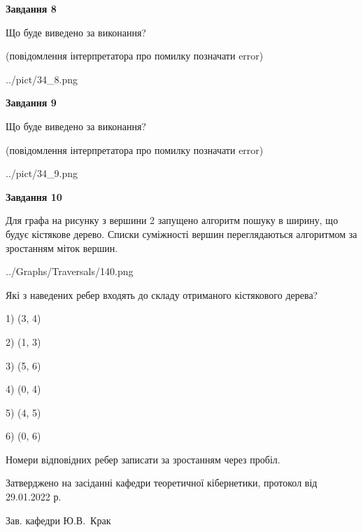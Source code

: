 \documentclass[12pt, ukrainian]{article}
\begin{document}
{\begin {large}
{\begin {center}\textbf{Завдання 8}\end {center}}\par
Що буде виведено за виконання?\par
 (повідомлення інтерпретатора про помилку позначати error)\par
\begin{center}
	{../pict/34_8.png}
\end{center}
\newpage

{\begin {center}\textbf{Завдання 9}\end {center}}\par
Що буде виведено за виконання?\par
 (повідомлення інтерпретатора про помилку позначати error)\par
\begin{center}
	{../pict/34_9.png}
\end{center}
\newpage

{\begin {center}\textbf{Завдання 10}\end {center}}\par
Для графа на рисунку з вершини 2 запущено алгоритм пошуку в ширину, що будує кістякове дерево. Списки суміжності вершин переглядаються алгоритмом за зростанням міток вершин.\par
\begin{center}
	{../Graphs/Traversals/140.png}
\end{center}
\par Які з наведених ребер входять до складу отриманого кістякового дерева?\par
1) (3, 4)\par
2) (1, 3)\par
3) (5, 6)\par
4) (0, 4)\par
5) (4, 5)\par
6) (0, 6)\par
{\vskip 15pt} Номери відповідних ребер записати за зростанням через пробіл.\par
\newpage


\end {large}
}
{\smallskip \begin {small} Затверджено на засіданні кафедри теоретичної кібернетики, протокол  від   29.01.2022 р.\par\smallskip\smallskip
{\parbox {6.5 cm}{Зав. кафедри \dotfill Ю.В.~Крак}} \end{small}}
\end{document}

